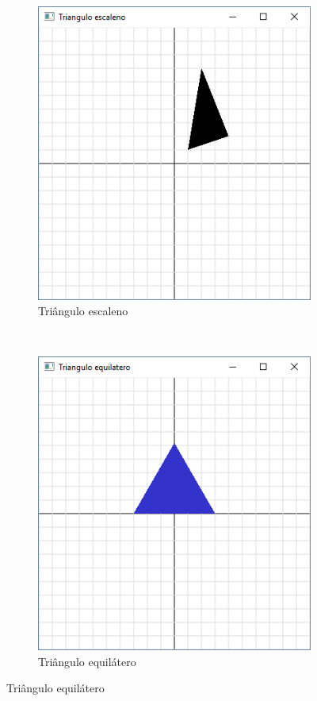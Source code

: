 \begin{enumerate}
\begin{figure}[h!]
\begin{subfigure}[b]{0.3\textwidth}
        \centerline{\includegraphics[width=.9\textwidth]{img/cap1_ex23b}}
        \caption{Triângulo escaleno}
        \label{fig:cap01_ex23b}
    \end{subfigure}
    ~
    \begin{subfigure}[b]{0.3\textwidth}
        \centerline{\includegraphics[width=.9\textwidth]{img/cap1_ex23c}}
        \caption{Triângulo equilátero}
        \label{fig:cap01_ex23c}
    \end{subfigure}

\end{figure}

\label{ex:cap01_ex23}

\end{enumerate}

